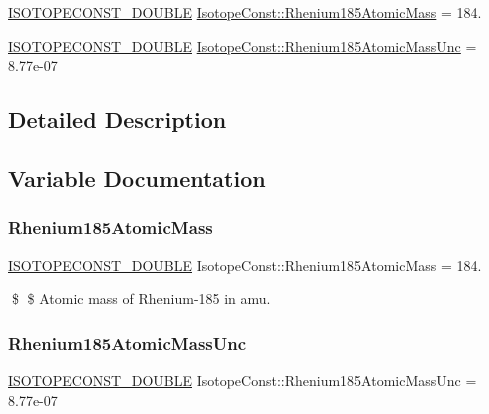 \begin{DoxyCompactItemize}
\item 
\mbox{\hyperlink{group___isotope_const-_macros_ga8f45a7272ce02c0b4c65c44636ed719a}{I\+S\+O\+T\+O\+P\+E\+C\+O\+N\+S\+T\+\_\+\+D\+O\+U\+B\+LE}} \mbox{\hyperlink{group___isotope_const-_rhenium-_re185_ga367e1d079458f51ef8af026797c562a6}{Isotope\+Const\+::\+Rhenium185\+Atomic\+Mass}} = 184.
\item 
\mbox{\hyperlink{group___isotope_const-_macros_ga8f45a7272ce02c0b4c65c44636ed719a}{I\+S\+O\+T\+O\+P\+E\+C\+O\+N\+S\+T\+\_\+\+D\+O\+U\+B\+LE}} \mbox{\hyperlink{group___isotope_const-_rhenium-_re185_gad6e1b7043ec49da300ee20daac6d220c}{Isotope\+Const\+::\+Rhenium185\+Atomic\+Mass\+Unc}} = 8.\+77e-\/07
\end{DoxyCompactItemize}


\subsection{Detailed Description}


\subsection{Variable Documentation}
\mbox{\label{group___isotope_const-_rhenium-_re185_ga367e1d079458f51ef8af026797c562a6}} 
\subsubsection{\texorpdfstring{Rhenium185\+Atomic\+Mass}{Rhenium185AtomicMass}}
{\footnotesize\ttfamily \mbox{\hyperlink{group___isotope_const-_macros_ga8f45a7272ce02c0b4c65c44636ed719a}{I\+S\+O\+T\+O\+P\+E\+C\+O\+N\+S\+T\+\_\+\+D\+O\+U\+B\+LE}} Isotope\+Const\+::\+Rhenium185\+Atomic\+Mass = 184.}

\$ \$ Atomic mass of Rhenium-\/185 in amu. \mbox{\label{group___isotope_const-_rhenium-_re185_gad6e1b7043ec49da300ee20daac6d220c}} 
\subsubsection{\texorpdfstring{Rhenium185\+Atomic\+Mass\+Unc}{Rhenium185AtomicMassUnc}}
{\footnotesize\ttfamily \mbox{\hyperlink{group___isotope_const-_macros_ga8f45a7272ce02c0b4c65c44636ed719a}{I\+S\+O\+T\+O\+P\+E\+C\+O\+N\+S\+T\+\_\+\+D\+O\+U\+B\+LE}} Isotope\+Const\+::\+Rhenium185\+Atomic\+Mass\+Unc = 8.\+77e-\/07}

